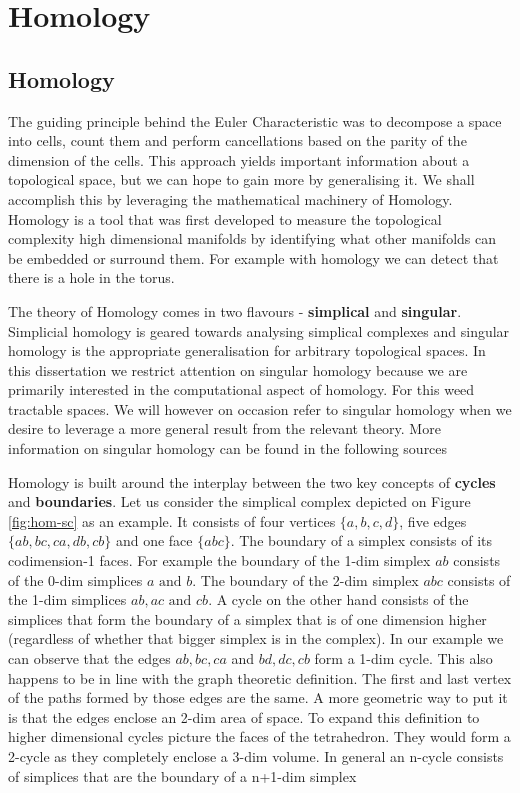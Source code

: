 \chapter{Homology}
\label{chapter5}

\section{Homology}

The guiding principle behind the Euler Characteristic was to decompose a space into cells, count them and perform cancellations based on the parity of the dimension of the cells. This approach yields important information about a topological space, but we can hope to gain more by generalising it. We shall accomplish this by leveraging the mathematical machinery of Homology. Homology is a tool that was first developed to measure the topological complexity high dimensional manifolds \cite{persistence-original} by identifying what other manifolds can be embedded or surround them. For example with homology we can detect that there is a hole in the torus.

The theory of Homology comes in two flavours - \textbf{simplical} and \textbf{singular}. Simplicial homology is geared towards analysing simplical complexes and singular homology is the appropriate generalisation for arbitrary topological spaces. In this dissertation we restrict attention on singular homology because we are primarily interested in the computational aspect of homology. For this weed tractable spaces. We will however on occasion refer to singular homology when we desire to leverage a more general result from the relevant theory. More information on singular homology can be found in the following sources \cite{algebraic-topology, elementary-applied-topology}


Homology is built around the interplay between the two key concepts of \textbf{cycles} and \textbf{boundaries}. Let us consider the simplical complex depicted on Figure \ref{fig:hom-sc} as an example. It consists of four vertices $\{a, b, c, d\}$, five edges $\{ab, bc, ca, db, cb\}$ and one face $\{abc\}$. The boundary of a simplex consists of its codimension-1 faces. For example the boundary of the 1-dim simplex $ab$ consists of the 0-dim simplices $a \text{ and } b$. The boundary of the 2-dim simplex $abc$ consists of the 1-dim simplices $ab, ac \text{ and } cb$. A cycle on the other hand consists of the simplices that form the boundary of a simplex that is of one dimension higher (regardless of whether that bigger simplex is in the complex). In our example we can observe that the edges $ab, bc, ca$ and $bd, dc, cb$ form a 1-dim cycle.  This also happens to be in line with the graph theoretic definition. The first and last vertex of the paths formed by those edges are the same. A more geometric way to put it is that the edges enclose an 2-dim area of space.  To expand this definition to higher dimensional cycles picture the faces of the tetrahedron. They would form a 2-cycle as they completely enclose a 3-dim volume. In general an n-cycle consists of simplices that are the boundary of a n+1-dim simplex

